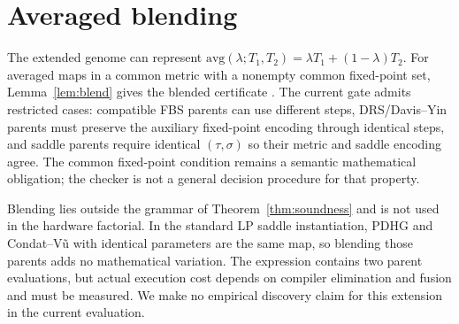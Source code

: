 \section{Averaged blending}
\label{app:blending}

The extended genome can represent
$\mathrm{avg}(\lambda;T_1,T_2)=\lambda T_1+(1-\lambda)T_2$.
For averaged maps in a common metric with a nonempty common fixed-point set,
Lemma~\ref{lem:blend} gives the blended certificate
\citep{RyuYin2022LargeScale,CombettesYamada2015Compositions}.
The current gate admits restricted cases: compatible FBS parents can use
different steps, DRS/Davis--Yin parents must preserve the auxiliary fixed-point
encoding through identical steps, and saddle parents require identical
$(\tau,\sigma)$ so their metric and saddle encoding agree. The common
fixed-point condition remains a semantic mathematical obligation; the checker
is not a general decision procedure for that property.

Blending lies outside the grammar of Theorem~\ref{thm:soundness} and is not
used in the hardware factorial. In the standard LP saddle instantiation,
PDHG and Condat--V\~u with identical parameters are the same map, so blending
those parents adds no mathematical variation. The expression contains two
parent evaluations, but actual execution cost depends on compiler elimination
and fusion and must be measured. We make no empirical discovery claim for this
extension in the current evaluation.

